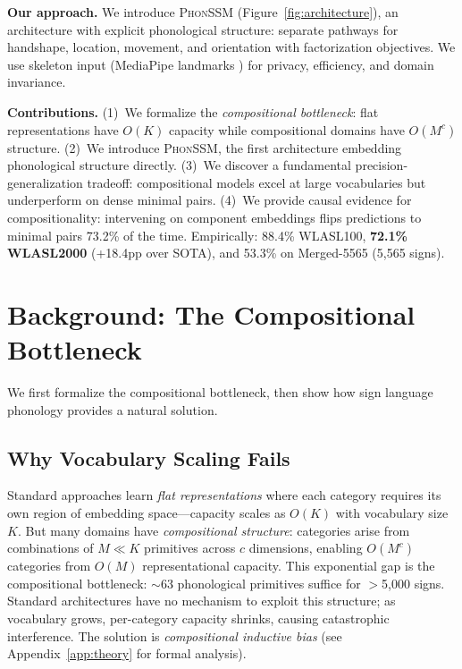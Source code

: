 \documentclass{article}
\theoremstyle{definition}
\theoremstyle{remark}
\newcommand{\phonssm}{\textsc{PhonSSM}}
\begin{document}
\textbf{Our approach.} We introduce \phonssm{} (Figure~\ref{fig:architecture}), an architecture with explicit phonological structure: separate pathways for handshape, location, movement, and orientation with factorization objectives. We use skeleton input (MediaPipe landmarks \citep{lugaresi2019mediapipe}) for privacy, efficiency, and domain invariance.

\textbf{Contributions.} (1)~We formalize the \textit{compositional bottleneck}: flat representations have $O(K)$ capacity while compositional domains have $O(M^c)$ structure. (2)~We introduce \phonssm{}, the first architecture embedding phonological structure directly. (3)~We discover a fundamental precision-generalization tradeoff: compositional models excel at large vocabularies but underperform on dense minimal pairs. (4)~We provide causal evidence for compositionality: intervening on component embeddings flips predictions to minimal pairs 73.2\% of the time. Empirically: 88.4\% WLASL100, \textbf{72.1\% WLASL2000} (+18.4pp over SOTA), and 53.3\% on Merged-5565 (5,565 signs).

\section{Background: The Compositional Bottleneck}
\label{sec:background}

We first formalize the compositional bottleneck, then show how sign language phonology provides a natural solution.

\subsection{Why Vocabulary Scaling Fails}

Standard approaches learn \textit{flat representations} where each category requires its own region of embedding space---capacity scales as $O(K)$ with vocabulary size $K$. But many domains have \textit{compositional structure}: categories arise from combinations of $M \ll K$ primitives across $c$ dimensions, enabling $O(M^c)$ categories from $O(M)$ representational capacity. This exponential gap is the compositional bottleneck: $\sim$63 phonological primitives suffice for $>$5,000 signs. Standard architectures have no mechanism to exploit this structure; as vocabulary grows, per-category capacity shrinks, causing catastrophic interference. The solution is \textit{compositional inductive bias} (see Appendix~\ref{app:theory} for formal analysis).
\end{document}
